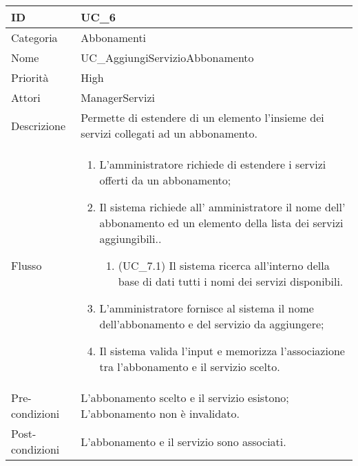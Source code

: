 \begin{center}
\begin{tabular}{ |p{2cm}|p{13cm}|  }
\hline
ID & UC\_6 \\\hline
Categoria & Abbonamenti\\\hline
Nome & UC\_AggiungiServizioAbbonamento\\\hline
Priorità & High \\\hline
Attori &  ManagerServizi \\\hline
Descrizione & Permette di estendere di un elemento l'insieme dei servizi collegati ad un abbonamento.\\\hline
Flusso &  	\begin{enumerate}
			\item L'amministratore richiede di estendere i servizi offerti da un abbonamento;
			\item Il sistema richiede all' amministratore il nome dell' abbonamento ed un elemento della lista dei servizi aggiungibili..
			\begin{enumerate}
				\item (UC\_7.1) Il sistema ricerca all'interno della base di dati tutti i nomi dei servizi disponibili.
			\end{enumerate}
			\item L'amministratore fornisce al sistema il nome dell'abbonamento e del servizio da aggiungere;
			\item Il sistema valida l'input e memorizza l'associazione tra l'abbonamento e il servizio scelto.
		\end{enumerate}\\\hline
Pre-condizioni & L'abbonamento scelto e il servizio esistono;\newline 
			L'abbonamento non è invalidato.\\\hline
Post-condizioni &  L'abbonamento e il servizio sono associati.\\\hline
\end{tabular}
\label{table_use_case:6}\newline


\end{center}
